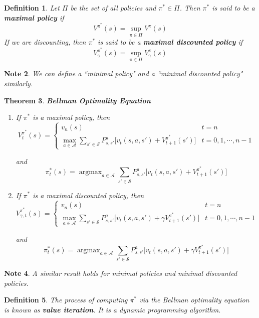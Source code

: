 \documentclass[12pt]{amsart}
\newtheorem{thm}{Theorem}[section]
\newtheorem{defn}[thm]{Definition}
\newtheorem{note}[thm]{Note}
\newcommand{\gam}{\gamma}
\newcommand{\MA}{\mathcal{A}}
\newcommand{\MS}{\mathcal{S}}
\DeclareMathOperator*{\argmax}{argmax}
\begin{document}
\begin{defn}
Let $\Pi$ be the set of all policies and $\pi^* \in \Pi$. Then $\pi^*$ is said to be a \textbf{maximal policy} if$$V^{\pi^*}(s) = \sup_{\pi \in \Pi}V^{\pi}(s)$$ If we are discounting, then $\pi^*$ is said to be a \textbf{maximal discounted policy} if $$V_{\gam}^{\pi^*}(s) = \sup_{\pi \in \Pi}V_{\gam}^{\pi}(s)$$ 
\end{defn}

\begin{note}
We can define a ``minimal policy" and a ``minimal discounted policy" similarly.
\end{note}
\newpage

\begin{thm}{\textbf{Bellman Optimality Equation}} 
\begin{enumerate}
\item If $\pi^*$ is a maximal policy, then 
\[ V_t^{\pi^*}(s) =
\begin{cases}
 v_n(s) & t = n \\
 \max\limits_{a \in \MA} \sum\limits_{s' \in \MS}P^{a}_{s, s'} \bigg[v_t(s,a, s') + V_{t+1}^{\pi^*}(s')\bigg] & t= 0, 1, \cdots, n-1
\end{cases}
\]

and $$\pi^*_t(s) = \argmax_{a \in \MA} \sum\limits_{s' \in \MS}P^{a}_{s, s'} \bigg[v_t(s, a, s') +  V_{t+1}^{\pi^*}(s')\bigg]$$ 

\item If $\pi^*$ is a maximal discounted policy, then 
\[ V_{\gam, t}^{\pi^*}(s) =
\begin{cases}
 v_n(s) & t = n \\
 \max\limits_{a \in \MA} \sum\limits_{s' \in \MS}P^{a}_{s, s'} \bigg[v_t(s,a, s') + \gam V_{t+1}^{\pi^*}(s')\bigg] & t= 0, 1, \cdots, n-1
\end{cases}
\]

and $$\pi^*_t(s) = \argmax_{a \in \MA} \sum\limits_{s' \in \MS}P^{a}_{s, s'} \bigg[v_t(s, a, s') +  \gam V_{t+1}^{\pi^*}(s')\bigg]$$ 
\end{enumerate}
\end{thm}

\begin{note}
A similar result holds for minimal policies and minimal discounted policies.
\end{note}

\begin{defn}
The process of computing $\pi^*$ via the Bellman optimality equation is known as \textbf{value iteration}. It is a dynamic programming algorithm. 
\end{defn}
\end{document}

